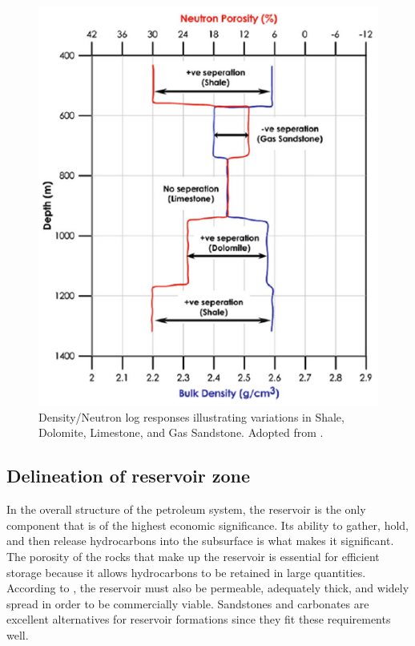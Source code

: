 \documentclass{gji}
\begin{document}
\begin{figure} %
    \centering    \includegraphics[width=\linewidth]{neutronporo} 
    \caption{Density/Neutron log responses illustrating variations in Shale, Dolomite, Limestone, and Gas Sandstone. Adopted from \cite{mondol2015well}.}
    \label{fig:neutronporo}
\end{figure}

\subsection{Delineation of reservoir zone} \label{subsec:reservoir}

In the overall structure of the petroleum system, the reservoir is the only component that is of the highest economic significance. Its ability to gather, hold, and then release hydrocarbons into the subsurface is what makes it significant. 
The porosity of the rocks that make up the reservoir is essential for efficient storage because it allows hydrocarbons to be retained in large quantities.
According to \cite{oyeyemi2018hydrocarbon}, the reservoir must also be permeable, adequately thick, and widely spread in order to be commercially viable. 
Sandstones and carbonates are excellent alternatives for reservoir formations since they fit these requirements well.
\end{document}
